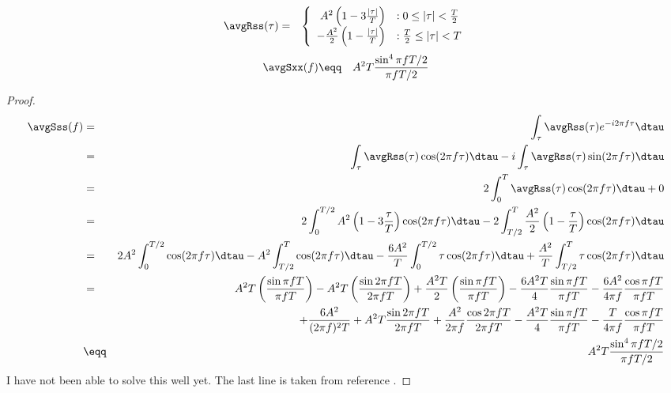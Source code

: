 \begin{theorem}
\begin{eqnarray*}
   \avgRss(\tau) 
     &=& \left\{
         \begin{array}{rl}
             A^2\left(1 - 3\frac{|\tau|}{T} \right)             & : 0 \le |\tau| < \frac{T}{2} \\
             -\frac{A^2}{2} \left(1 - \frac{|\tau|}{T} \right)  & : \frac{T}{2} \le |\tau| < T 
         \end{array}
         \right.
\end{eqnarray*}
\attention
\begin{eqnarray*}
   \avgSxx(f) 
    &\eqq& A^2 T\frac{\sin^4\pi f T/2}{\pi f T/2}
\end{eqnarray*}
\end{theorem}

\begin{proof}
\begin{eqnarray*}
  \avgSss(f)
    &=& \int_\tau \avgRss(\tau) e^{-i2\pi f\tau}\dtau
  \\&=& \int_\tau \avgRss(\tau) \cos(2\pi f\tau)\dtau
       -i\int_\tau \avgRss(\tau) \sin(2\pi f\tau)\dtau
  \\&=& 2\int_0^T \avgRss(\tau) \cos(2\pi f\tau)\dtau + 0
  \\&=& 2\int_0^{T/2} A^2\left(1-3\frac{\tau}{T}\right) \cos(2\pi f\tau)\dtau 
       -2\int_{T/2}^T \frac{A^2}{2}\left(1-\frac{\tau}{T}\right) \cos(2\pi f\tau)\dtau 
  \\&=& 2A^2\int_0^{T/2} \cos(2\pi f\tau)\dtau 
       -A^2\int_{T/2}^T  \cos(2\pi f\tau)\dtau 
       -\frac{6A^2}{T}\int_0^{T/2} \tau \cos(2\pi f\tau)\dtau 
       +\frac{A^2}{T}\int_{T/2}^T  \tau \cos(2\pi f\tau)\dtau 
  \\&=& A^2T\left( \frac{\sin\pi fT}{\pi fT}\right)
       -A^2T\left( \frac{\sin2\pi fT}{2\pi fT}\right)
       +\frac{A^2T}{2}\left( \frac{\sin\pi fT}{\pi fT}\right)
       -\frac{6A^2T}{4}\frac{\sin\pi fT}{\pi fT}
       -\frac{6A^2}{4\pi f}\frac{\cos\pi fT}{\pi fT}
\\&&
       + \frac{6A^2}{(2\pi f)^2T}
       + A^2T\frac{\sin2\pi fT}{2\pi fT} 
       + \frac{A^2}{2\pi f}\frac{\cos2\pi fT}{2\pi fT}
       - \frac{A^2T}{4}\frac{\sin\pi fT}{\pi fT}
       - \frac{T}{4\pi f}\frac{\cos\pi fT}{\pi fT}
  \\&\eqq& A^2 T \frac{\sin^4\pi f T/2}{\pi f T/2}
\end{eqnarray*}
\attention
I have not been able to solve this well yet.
The last line is taken from reference
\cite{kao}.
\end{proof}

